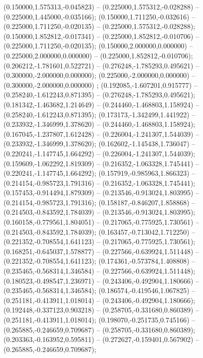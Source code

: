  (0.150000,1.575313,-0.045823) -- (0.225000,1.575312,-0.028288) -- (0.225000,1.445000,-0.035166);
 (0.150000,1.711250,-0.032616) -- (0.225000,1.711250,-0.020135) -- (0.225000,1.575312,-0.028288);
 (0.150000,1.852812,-0.017341) -- (0.225000,1.852812,-0.010706) -- (0.225000,1.711250,-0.020135);
 (0.150000,2.000000,0.000000) -- (0.225000,2.000000,0.000000) -- (0.225000,1.852812,-0.010706);
 (0.206212,-1.781601,0.522721) -- (0.276248,-1.785293,0.495621) -- (0.300000,-2.000000,0.000000);
 (0.225000,-2.000000,0.000000) -- (0.300000,-2.000000,0.000000) ;
 (0.192085,-1.607201,0.915777) -- (0.258240,-1.612243,0.871395) -- (0.276248,-1.785293,0.495621);
 (0.181342,-1.463682,1.214649) -- (0.244460,-1.468803,1.158924) -- (0.258240,-1.612243,0.871395);
 (0.173173,-1.342499,1.441922) -- (0.233932,-1.346999,1.378620) -- (0.244460,-1.468803,1.158924);
 (0.167045,-1.237807,1.612428) -- (0.226004,-1.241307,1.544039) -- (0.233932,-1.346999,1.378620);
 (0.162602,-1.145438,1.736047) -- (0.220241,-1.147745,1.664292) -- (0.226004,-1.241307,1.544039);
 (0.159609,-1.062292,1.819309) -- (0.216352,-1.063328,1.745441) -- (0.220241,-1.147745,1.664292);
 (0.157919,-0.985963,1.866323) -- (0.214154,-0.985723,1.791316) -- (0.216352,-1.063328,1.745441);
 (0.157453,-0.914494,1.879309) -- (0.213546,-0.913024,1.803995) -- (0.214154,-0.985723,1.791316);
 (0.158187,-0.846207,1.858868) -- (0.214503,-0.843592,1.784039) -- (0.213546,-0.913024,1.803995);
 (0.160158,-0.779561,1.804051) -- (0.217065,-0.775925,1.730561) -- (0.214503,-0.843592,1.784039);
 (0.163457,-0.713042,1.712250) -- (0.221352,-0.708554,1.641123) -- (0.217065,-0.775925,1.730561);
 (0.168251,-0.645037,1.578877) -- (0.227566,-0.639924,1.511448) -- (0.221352,-0.708554,1.641123);
 (0.174361,-0.573784,1.408808) -- (0.235465,-0.568314,1.346584) -- (0.227566,-0.639924,1.511448);
 (0.180523,-0.498547,1.236971) -- (0.243406,-0.492904,1.180666) -- (0.235465,-0.568314,1.346584);
 (0.186574,-0.419546,1.067825) -- (0.251181,-0.413911,1.018014) -- (0.243406,-0.492904,1.180666);
 (0.192448,-0.337123,0.903218) -- (0.258705,-0.331680,0.860389) -- (0.251181,-0.413911,1.018014);
 (0.198070,-0.251735,0.745166) -- (0.265885,-0.246659,0.709687) -- (0.258705,-0.331680,0.860389);
 (0.203363,-0.163952,0.595811) -- (0.272627,-0.159401,0.567902) -- (0.265885,-0.246659,0.709687);
